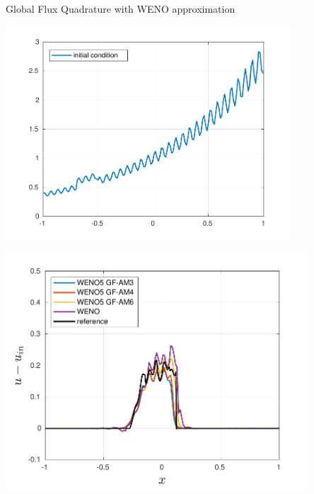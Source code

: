 \begin{frame}[t]{Global Flux Quadrature  with WENO approximation}
{	
	\begin{minipage}{0.5\textwidth}
		\centering\includegraphics[width=0.8\textwidth]{figs/WENO-FD/figures/Burgers/perturbations/initial_cond_DISC_n150} 
	\end{minipage}\hfill
	\begin{minipage}{0.5\textwidth}
		\centering\includegraphics[width=0.85\textwidth]{figs/WENO-FD/figures/Burgers/perturbations/weno5_AM_DISC_n150} 
	\end{minipage}
}

\end{frame}
